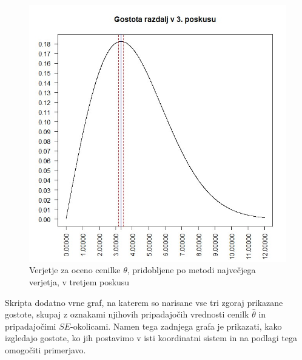 \documentclass[a4paper, 10pt]{article}
\begin{document}
	\begin{figure}[h!]
		\label{fig: 2Dplot3}
		\centering
		\includegraphics[scale = 0.4]{VerjetjeMNV3}
		\caption{Verjetje za oceno cenilke $\theta$, pridobljene po metodi največjega verjetja, v tretjem poskusu}
	\end{figure}

	Skripta dodatno vrne graf, na katerem so narisane vse tri zgoraj prikazane gostote, skupaj z oznakami njihovih pripadajočih vrednosti cenilk $\widehat{\theta}$ in pripadajočimi $SE$-okolicami. Namen tega zadnjega grafa je prikazati, kako izgledajo gostote, ko jih postavimo v isti koordinatni sistem in na podlagi tega omogočiti primerjavo.
	
\end{document}
